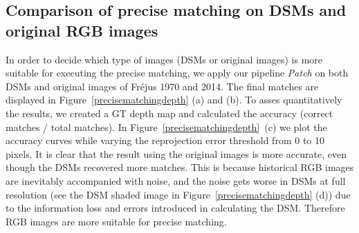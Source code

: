 \subsection{Comparison of precise matching on DSMs and original RGB images}
\label{CompareRGBDSM}
In order to decide which type of images (DSMs or original images) is more suitable for executing the precise matching, we apply our pipeline \textit{Patch} on both DSMs and original images of Fr{\'e}jus 1970 and 2014.
The final matches are displayed in Figure~\ref{precisematchingdepth} (a) and (b). 
To asses quantitatively the results, we created a GT depth map and calculated the accuracy (correct matches / total matches). In Figure~\ref{precisematchingdepth}~(c) we plot the accuracy curves while varying the reprojection error threshold from 0 to 10 pixels. 
It is clear that the result using the original images is more accurate, even though the DSMs recovered more matches.
This is because historical RGB images are inevitably accompanied with noise, and the noise gets worse in \ac{DSM}s at full resolution (see the DSM shaded image in Figure~\ref{precisematchingdepth} (d)) due to the information loss and errors introduced in calculating the \ac{DSM}. Therefore RGB images are more suitable for precise matching.\\
